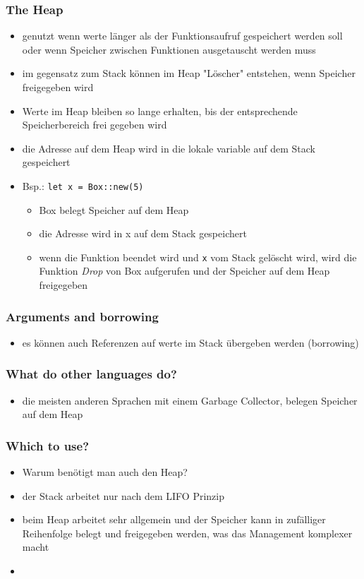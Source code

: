 \documentclass[a4paper,12pt]{article}
\newcommand\mpar[1]{\marginpar {\flushleft\sffamily\scriptsize #1}}
\begin{document}
\subsubsection*{The Heap}
	\begin{itemize}
	  \item genutzt wenn werte länger als der Funktionsaufruf gespeichert werden soll oder wenn Speicher zwischen Funktionen ausgetauscht werden muss
	  \item im gegensatz zum Stack können im Heap "Löscher" entstehen, wenn Speicher freigegeben wird
	  \item Werte im Heap bleiben so lange erhalten, bis der entsprechende  Speicherbereich frei gegeben wird
	  \item 	die Adresse auf dem Heap wird in die lokale variable auf dem Stack gespeichert
	  \newpage
	  \item Bsp.: \verb|let x = Box::new(5)|
	  \begin{itemize}
	    \item Box belegt Speicher auf dem Heap
	    \item die Adresse wird in x auf dem Stack gespeichert
	    \item wenn die Funktion beendet wird und \verb|x| vom Stack gelöscht wird, wird die Funktion \textit{Drop} von Box aufgerufen und der Speicher auf dem Heap freigegeben
	  \end{itemize}
	 \end{itemize}

\subsubsection*{Arguments and borrowing}
	\begin{itemize}
	  \item es können auch Referenzen auf werte im Stack übergeben werden (borrowing)
	\end{itemize}
	
\subsubsection*{What do other languages do?}
	\begin{itemize}
	  \item die meisten anderen Sprachen mit einem Garbage Collector, belegen Speicher auf dem Heap 
	\end{itemize}
	
\subsubsection*{Which to use?} \mpar{siehe Daten-\\strukturen}	
	\begin{itemize}
	  \item Warum benötigt man auch den Heap?
	  \item der Stack arbeitet nur nach dem LIFO Prinzip 
	  \item beim Heap arbeitet sehr allgemein und der Speicher kann in zufälliger Reihenfolge belegt und freigegeben werden, was das Management komplexer macht   
	  \item 
	\end{itemize}
	
\end{document}
